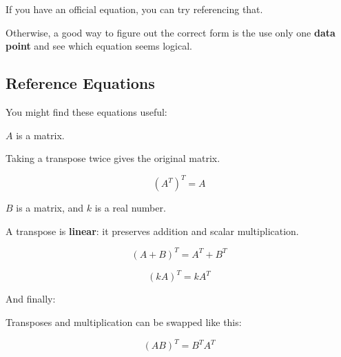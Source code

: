         If you have an official equation, you can try referencing that.
        
        Otherwise, a good way to figure out the correct form is the use only one \textbf{data point} and see which equation seems logical.
    
    \subsection*{Reference Equations}
    
        You might find these equations useful:
        
        $A$ is a matrix.\\
        
        \begin{kequation}
            Taking a transpose twice gives the original matrix.
            
            \begin{equation*}
                (A^T)^T=A
            \end{equation*}
        \end{kequation}
        
        $B$ is a matrix, and $k$ is a real number.\\
            
        \begin{kequation}
            
            A transpose is \textbf{linear}: it preserves addition and scalar multiplication.
            
            \begin{equation*}
                (A+B)^T=A^T+B^T
            \end{equation*}
            
            \begin{equation*}
                (kA)^T = kA^T
            \end{equation*}
        \end{kequation}
        
        And finally:\\
        
        \begin{kequation}
            
            Transposes and multiplication can be swapped like this:
            
            \begin{equation*}
                (AB)^T=B^TA^T
            \end{equation*}
            
        \end{kequation}
    
    
    
    